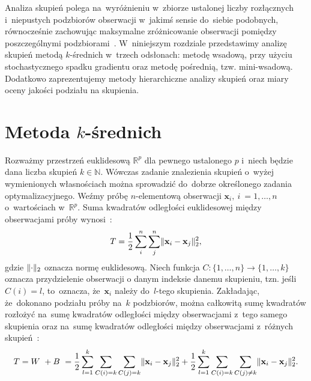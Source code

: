 \documentclass{praca1}
\DeclarePairedDelimiter{\norm}{\lVert}{\rVert}
\begin{document}
Analiza skupień polega na~wyróżnieniu w~zbiorze ustalonej liczby rozłącznych i~niepustych podzbiorów obserwacji w~jakimś sensie do~siebie podobnych, równocześnie zachowując maksymalne zróżnicowanie obserwacji pomiędzy poszczególnymi podzbiorami~\cite{Koronacki2005:statystyczne}. W~niniejszym rozdziale przedstawimy analizę skupień metodą $k$-średnich w~trzech odsłonach: metodę wsadową, przy użyciu stochastycznego spadku gradientu oraz metodę pośrednią, tzw. mini-wsadową. Dodatkowo zaprezentujemy metody hierarchiczne analizy skupień oraz miary oceny jakości podziału na skupienia.

\section{Metoda $k$-średnich}

Rozważmy przestrzeń euklidesową $\mathbb{R}^p$ dla pewnego ustalonego $p$ i~niech będzie dana liczba skupień $k\in \mathbb{N}$. Wówczas zadanie znalezienia skupień o~wyżej wymienionych własnościach można sprowadzić do~dobrze określonego zadania optymalizacyjnego. Weźmy próbę $n$-elementową obserwacji $\mathbf{x}_i,\ i~= 1,\ldots,n$ o~wartościach w~$\mathbb{R}^p$. %
Suma kwadratów odległości euklidesowej między obserwacjami próby wynosi~\cite{Koronacki2005:statystyczne}:
\begin{equation}
T = \frac{1}{2}\sum\limits_{i}^{n}\sum\limits_{j}^{n} \norm{\mathbf{x}_i - \mathbf{x}_j}_2^2,
\end{equation}
gdzie $\norm{\cdot}_2$ oznacza normę euklidesową. Niech funkcja $C:\{1,\ldots,n\} \rightarrow \{1,\ldots, k\}$ oznacza przydzielenie obserwacji o danym indeksie danemu skupieniu, tzn. jeśli $C(i) = l$, to~oznacza, że~$\mathbf{x}_i$ należy do~$l$-tego skupienia. Zakładając, że~dokonano podziału próby na~$k$ podzbiorów, można całkowitą sumę kwadratów rozłożyć na~sumę kwadratów odległości między obserwacjami z~tego samego skupienia oraz na~sumę kwadratów odległości między obserwacjami z~różnych skupień~\cite{Koronacki2005:statystyczne}:
\begin{equation}
T = W~+ B~= \frac{1}{2}\sum\limits_{l=1}^{k}\sum\limits_{C(i) = k}\sum\limits_{C(j) = k} \norm{\mathbf{x}_i - \mathbf{x}_j}_2^2 + \frac{1}{2}\sum\limits_{l=1}^{k}\sum\limits_{C(i) = k}\sum\limits_{C(j) \neq k} \norm{\mathbf{x}_i - \mathbf{x}_j}_2^2.
\end{equation}
\end{document}
